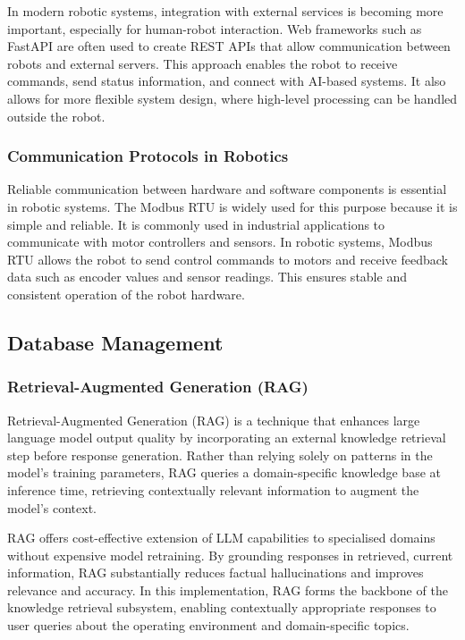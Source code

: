 In modern robotic systems, integration with external services is becoming more important, especially for human-robot interaction. Web frameworks such as FastAPI are often used to create REST APIs that allow communication between robots and external servers. This approach enables the robot to receive commands, send status information, and connect with AI-based systems. It also allows for more flexible system design, where high-level processing can be handled outside the robot.

\subsubsection{Communication Protocols in Robotics}

Reliable communication between hardware and software components is essential in robotic systems. The Modbus RTU is widely used for this purpose because it is simple and reliable. It is commonly used in industrial applications to communicate with motor controllers and sensors. In robotic systems, Modbus RTU allows the robot to send control commands to motors and receive feedback data such as encoder values and sensor readings. This ensures stable and consistent operation of the robot hardware.

\subsection{Database Management}

\subsubsection{Retrieval-Augmented Generation (RAG)}

Retrieval-Augmented Generation (RAG) is a technique that enhances large language model output quality by incorporating an external knowledge retrieval step before response generation. Rather than relying solely on patterns in the model's training parameters, RAG queries a domain-specific knowledge base at inference time, retrieving contextually relevant information to augment the model's context.

RAG offers cost-effective extension of LLM capabilities to specialised domains without expensive model retraining. By grounding responses in retrieved, current information, RAG substantially reduces factual hallucinations and improves relevance and accuracy. In this implementation, RAG forms the backbone of the knowledge retrieval subsystem, enabling contextually appropriate responses to user queries about the operating environment and domain-specific topics.

